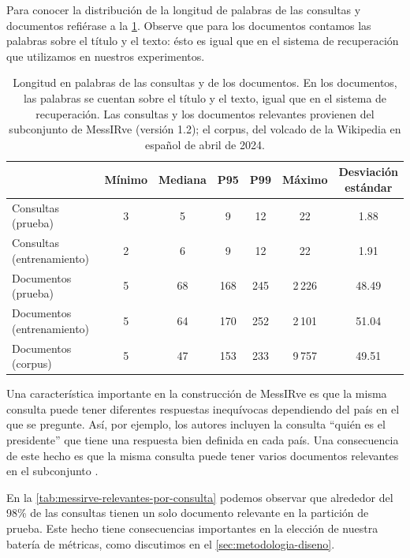 Para conocer la distribución de la longitud de palabras de las consultas y documentos refiérase a la \cref{tab:messirve-longitudes}. Observe que para los documentos contamos las palabras sobre el título y el texto: ésto es igual que en el sistema de recuperación que utilizamos en nuestros experimentos.

\begin{table}[tbp]
	\centering
	\begin{tabular}{@{}lcccccc@{}}
		\toprule
		 & Mínimo & Mediana & P95 & P99 & Máximo & \shortstack{Desviación\\estándar} \\
		\midrule
		Consultas (prueba)         & 3 & 5  & 9   & 12  & 22     & 1.88 \\
		Consultas (entrenamiento)  & 2 & 6  & 9   & 12  & 22     & 1.91 \\
		Documentos (prueba)        & 5 & 68 & 168 & 245 & 2\,226 & 48.49 \\
		Documentos (entrenamiento) & 5 & 64 & 170 & 252 & 2\,101 & 51.04 \\
		Documentos (corpus)        & 5 & 47 & 153 & 233 & 9\,757 & 49.51 \\
		\bottomrule
	\end{tabular}
	\caption{Longitud en palabras de las consultas y de los documentos. En los documentos, las palabras se cuentan sobre el título y el texto, igual que en el sistema de recuperación. Las consultas y los documentos relevantes provienen del subconjunto  de MessIRve (versión 1.2); el corpus, del volcado de la Wikipedia en español de abril de 2024.}
	\label{tab:messirve-longitudes}
\end{table}


Una característica importante en la construcción de MessIRve es que la misma consulta puede tener diferentes respuestas inequívocas dependiendo del país en el que se pregunte. Así, por ejemplo, los autores incluyen la consulta ``quién es el presidente'' que tiene una respuesta bien definida en cada país. Una consecuencia de este hecho es que la misma consulta puede tener varios documentos relevantes en el subconjunto . 

En la \cref{tab:messirve-relevantes-por-consulta} podemos observar que alrededor del 98\% de las consultas tienen un solo documento relevante en la partición de prueba. Este hecho tiene consecuencias importantes en la elección de nuestra batería de métricas, como discutimos en el \cref{sec:metodologia-diseno}.

